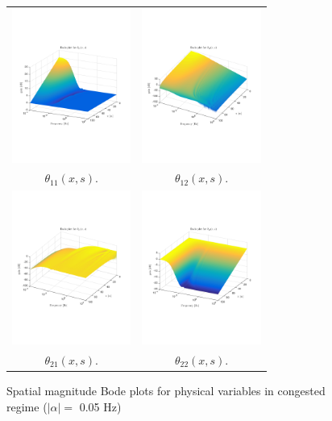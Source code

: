 \documentclass[a4paper, 10pt, conference]{ieeeconf}      %
\begin{document}
\begin{figure}
\centering
\begin{tabular}{cc}
\includegraphics[trim = 0mm 60mm 0mm 60mm, width = 3.9cm]{distr_theta_11}
&
\includegraphics[trim = 0mm 60mm 0mm 60mm, width = 3.9cm]{distr_theta_12}
\tabularnewline
$\theta_{11}(x,s)$.
&
$\theta_{12}(x,s)$.
\tabularnewline
\includegraphics[trim = 0mm 60mm 0mm 60mm, width = 3.9cm]{distr_theta_21}
&
\includegraphics[trim = 0mm 60mm 0mm 60mm, width = 3.9cm]{distr_theta_22}
\tabularnewline
$\theta_{21}(x,s)$.
&
$\theta_{22}(x,s)$.
\tabularnewline
\end{tabular}
\caption{Spatial magnitude Bode plots for physical variables in congested regime ($\left|\alpha\right| = $ 0.05 Hz)\label{fig:Magn_spatial_physx_congested}}
\end{figure}
\end{document}

